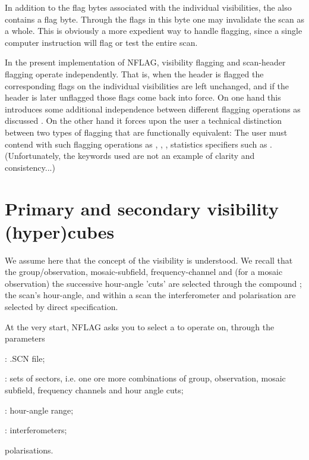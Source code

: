 	In addition to the flag bytes associated with the individual
visibilities, the  also contains a flag
byte. Through the flags in this byte one may invalidate the scan as a whole.
This is obviously a more expedient way to handle flagging, since a single
computer instruction will flag or test the entire scan.

	In the present implementation of NFLAG, visibility flagging and
scan-header flagging operate independently. That is, when the header is flagged
the corresponding flags on the individual visibilities are left unchanged, and
if the header is later unflagged those flags come back into force. On one hand
this introduces some additional independence between different flagging
operations as discussed . On the other hand it
forces upon the user a technical distinction between two types of flagging that
are functionally equivalent: The user must contend with such flagging
operations as
%
,
,
,
statistics specifiers such as
.
(Unfortunately, the keywords used are not an example of clarity and
consistency...)



\section{ Primary and secondary visibility (hyper)cubes}
\label{.hypercubes}

	We assume here that the concept of the visibility
 is understood. We recall that the
group/observation, mosaic-subfield, frequency-channel and (for a mosaic
observation) the successive hour-angle 'cuts' are selected through the compound
; the scan's hour-angle, and
within a scan the interferometer and polarisation are selected by direct
specification.

	At the very start, NFLAG asks you to select a  to operate on, through the parameters
\bi{}
\item{}:
	.SCN file;
\item   {}:
	sets of sectors, i.e. one ore more combinations of group, observation,
	mosaic subfield, frequency channels and hour angle cuts;
\item   {}:
	hour-angle range;
\item   {}:
	interferometers;
\item   {}
	polarisations.
\ei

